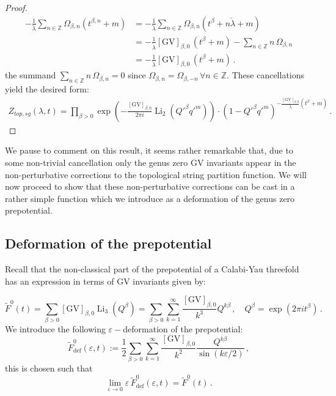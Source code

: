 \documentclass[a4paper,12pt,justification=centering]{article}
\numberwithin{equation}{section}
\theoremstyle{plain}%
\theoremstyle{definition}
\begin{document}
\begin{proof}
\begin{align}
-\frac{1 }{\check{\lambda}} \sum_{n\in\mathbb{Z}} \Omega_{\beta,n} \left( t^{\beta,n}+m\right) &=-\frac{1 }{\check{\lambda}} \sum_{n\in\mathbb{Z}} \Omega_{\beta,n} \left( t^{\beta}+  n\check{\lambda} +m\right)\\ &=-\frac{1 }{\check{\lambda}} [\textrm{GV}]_{\beta,0}\,  \left( t^{\beta}+   m\right)  -  \sum_{n\in\mathbb{Z}} n\,\Omega_{\beta,n} \\ 
&=-\frac{1 }{\check{\lambda}} [\textrm{GV}]_{\beta,0}\,  \left( t^{\beta}+   m\right)   \,.
\end{align}
the summand
$ \sum_{n\in\mathbb{Z}} n\,\Omega_{\beta,n}=0$ since $\Omega_{\beta,n}=\Omega_{\beta,-n}\, \forall n\in \mathbb{Z}$. These cancellations yield the desired form:
\begin{align}
 Z_{top,sg}(\lambda,t) =   \prod_{\beta>0} \exp\left(-\frac{[\textrm{GV}]_{\beta,0}}{2\pi i} \operatorname{Li}_2(Q'^{\beta} q'^m)\right) \cdot (1-Q'^{\beta} q'^m)^{-\frac{ [\textrm{GV}]_{\beta,0}}{\check{\lambda}}\left( t^{\beta}+m\right)}\,.
\end{align}
\end{proof}
We pause to comment on this result, it seems rather remarkable that, due to some non-trivial cancellation only the genus zero GV invariants appear in the non-perturbative corrections to the topological string partition function. We will now proceed to show that these non-perturbative corrections can be cast in a rather simple function which we introduce as a deformation of the genus zero prepotential.

\subsection{Deformation of the prepotential}\label{sec:defprepot}
Recall that the non-classical part of the prepotential of a Calabi-Yau threefold has an expression in terms of GV invariants given by:

\begin{equation}
 \tilde{F}^0(t)=\sum_{\beta>0} [\textrm{GV}]_{\beta,0} \operatorname{Li}_3(Q^{\beta}) = \sum_{\beta>0}\sum_{k=1}^{\infty} \frac{[\textrm{GV}]_{\beta,0}}{k^3} Q^{k\beta} \,, \quad Q^{\beta}= \exp(2\pi i t^{\beta})\,.
 \end{equation}
We introduce the following $\varepsilon-$deformation of the prepotential:
\begin{equation}
\tilde{F}^{0}_{\textrm{def}}(\varepsilon,t):=\frac{1}{2} \sum_{\beta>0} \sum_{k=1}^{\infty} \frac{[\textrm{GV}]_{\beta,0}}{k^2} \frac{Q^{k\beta}}{\sin(k\varepsilon/2)}\,,
\end{equation}
this is chosen such that
\begin{equation}
\lim_{\varepsilon\rightarrow 0} \varepsilon \, \tilde{F}^{0}_{\textrm{def}}(\varepsilon,t) =   \tilde{F}^{0}(t)\,.
\end{equation}
\end{document}
